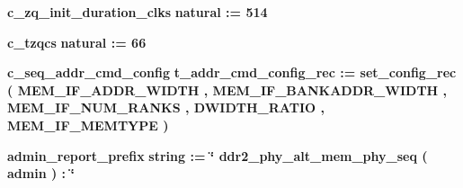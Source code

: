 \begin{DoxyCompactItemize}
\item 
{\bf c\+\_\+zq\+\_\+init\+\_\+duration\+\_\+clks} {\bfseries \textcolor{comment}{natural}\textcolor{vhdlchar}{ }\textcolor{vhdlchar}{ }\textcolor{vhdlchar}{\+:}\textcolor{vhdlchar}{=}\textcolor{vhdlchar}{ }\textcolor{vhdlchar}{ } \textcolor{vhdldigit}{514} \textcolor{vhdlchar}{ }} 
\item 
{\bf c\+\_\+tzqcs} {\bfseries \textcolor{comment}{natural}\textcolor{vhdlchar}{ }\textcolor{vhdlchar}{ }\textcolor{vhdlchar}{\+:}\textcolor{vhdlchar}{=}\textcolor{vhdlchar}{ }\textcolor{vhdlchar}{ } \textcolor{vhdldigit}{66} \textcolor{vhdlchar}{ }} 
\item 
{\bf c\+\_\+seq\+\_\+addr\+\_\+cmd\+\_\+config} {\bfseries {\bfseries {\bf t\+\_\+addr\+\_\+cmd\+\_\+config\+\_\+rec}} \textcolor{vhdlchar}{ }\textcolor{vhdlchar}{ }\textcolor{vhdlchar}{\+:}\textcolor{vhdlchar}{=}\textcolor{vhdlchar}{ }\textcolor{vhdlchar}{ }\textcolor{vhdlchar}{ }\textcolor{vhdlchar}{ }\textcolor{vhdlchar}{set\+\_\+config\+\_\+rec}\textcolor{vhdlchar}{ }\textcolor{vhdlchar}{(}\textcolor{vhdlchar}{ }\textcolor{vhdlchar}{ }\textcolor{vhdlchar}{ }\textcolor{vhdlchar}{ }{\bfseries {\bf M\+E\+M\+\_\+\+I\+F\+\_\+\+A\+D\+D\+R\+\_\+\+W\+I\+D\+TH}} \textcolor{vhdlchar}{ }\textcolor{vhdlchar}{,}\textcolor{vhdlchar}{ }\textcolor{vhdlchar}{ }\textcolor{vhdlchar}{ }\textcolor{vhdlchar}{ }{\bfseries {\bf M\+E\+M\+\_\+\+I\+F\+\_\+\+B\+A\+N\+K\+A\+D\+D\+R\+\_\+\+W\+I\+D\+TH}} \textcolor{vhdlchar}{ }\textcolor{vhdlchar}{,}\textcolor{vhdlchar}{ }\textcolor{vhdlchar}{ }\textcolor{vhdlchar}{ }\textcolor{vhdlchar}{ }{\bfseries {\bf M\+E\+M\+\_\+\+I\+F\+\_\+\+N\+U\+M\+\_\+\+R\+A\+N\+KS}} \textcolor{vhdlchar}{ }\textcolor{vhdlchar}{,}\textcolor{vhdlchar}{ }\textcolor{vhdlchar}{ }\textcolor{vhdlchar}{ }\textcolor{vhdlchar}{ }{\bfseries {\bf D\+W\+I\+D\+T\+H\+\_\+\+R\+A\+T\+IO}} \textcolor{vhdlchar}{ }\textcolor{vhdlchar}{,}\textcolor{vhdlchar}{ }\textcolor{vhdlchar}{ }\textcolor{vhdlchar}{ }\textcolor{vhdlchar}{ }{\bfseries {\bf M\+E\+M\+\_\+\+I\+F\+\_\+\+M\+E\+M\+T\+Y\+PE}} \textcolor{vhdlchar}{ }\textcolor{vhdlchar}{)}\textcolor{vhdlchar}{ }} 
\item 
{\bf admin\+\_\+report\+\_\+prefix} {\bfseries \textcolor{comment}{string}\textcolor{vhdlchar}{ }\textcolor{vhdlchar}{ }\textcolor{vhdlchar}{\+:}\textcolor{vhdlchar}{=}\textcolor{vhdlchar}{ }\textcolor{vhdlchar}{ }\textcolor{vhdlchar}{ }\textcolor{vhdlchar}{ }\textcolor{keyword}{\char`\"{} ddr2\+\_\+phy\+\_\+alt\+\_\+mem\+\_\+phy\+\_\+seq ( admin )  \+:  \char`\"{}}\textcolor{vhdlchar}{ }} 
\end{DoxyCompactItemize}
